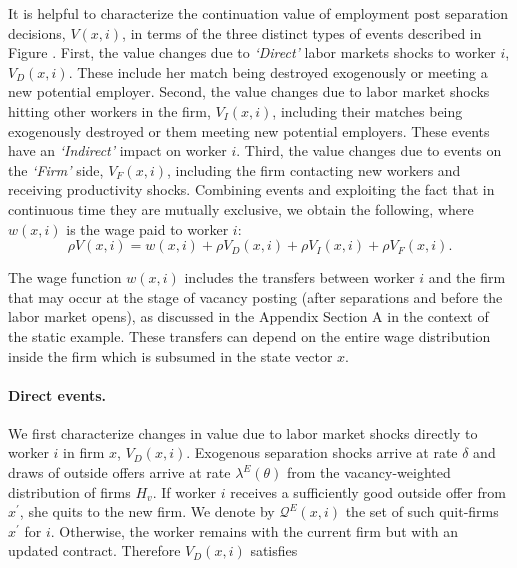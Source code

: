 It is helpful to characterize the continuation value of employment post separation
decisions, $V(x,i)$, in terms of the three distinct types of events
described in Figure . First, the value changes due to
\emph{`Direct'} labor markets shocks to worker $i$, $V_{D}(x,i)$. These
include her match being destroyed exogenously or meeting a new potential
employer. Second, the value changes due to labor market shocks hitting
other workers in the firm, $V_{I}(x,i)$, including their matches being
exogenously destroyed or them meeting new potential employers. These events
have an \emph{`Indirect'} impact on worker $i$. Third, the value changes due to
events on the \emph{`Firm'} side, $V_{F}(x,i)$, including the firm
contacting new workers and receiving productivity shocks. Combining
events and exploiting the fact that in continuous time they are mutually
exclusive, we obtain the following, where  $w\left( x,i\right)$ is the wage paid to worker $i$:
\begin{equation*}
\rho V\left( x,i\right) =w\left( x,i\right) +\rho V_{D}\left( x,i\right)
+\rho V_{I}\left( x,i\right) +\rho V_{F}\left( x,i\right).
\end{equation*}

The wage function $w(x,i)$ includes the transfers between worker $i$ and the firm that may occur at the stage of vacancy posting (after separations and before the labor market opens), as discussed in the Appendix Section A in the context of the static example. These transfers can depend on the entire wage distribution inside the firm which is subsumed in the state vector $x$.

\paragraph{Direct events.}

We first characterize changes in value due to labor market shocks directly to worker $i$ in firm $x$, $V_{D}(x,i)$. Exogenous separation shocks arrive at rate $\delta $ and draws of outside offers arrive at rate $\lambda^E(\theta)$ from the vacancy-weighted distribution of firms $H_v$. If worker $i$ receives a sufficiently good outside offer from $x^{\prime }$, she quits to the new firm. We denote by $\mathcal{Q}^{E}(x,i)$ the set of such quit-firms $x^{\prime}$
for $i$. Otherwise, the worker remains with the current firm but with an updated contract. Therefore $V_D(x,i)$ satisfies
\vspace{-0.1in}

